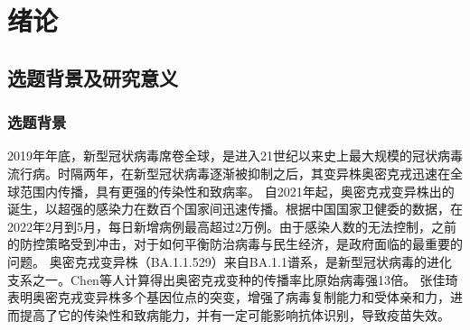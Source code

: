 



    


\section{绪论}
\subsection{选题背景及研究意义}
\subsubsection{选题背景}
2019年年底，新型冠状病毒席卷全球，是进入21世纪以来史上最大规模的冠状病毒流行病。时隔两年，在新型冠状病毒逐渐被抑制之后，其变异株奥密克戎迅速在全球范围内传播，具有更强的传染性和致病率。
自2021年起，奥密克戎变异株出的诞生，以超强的感染力在数百个国家间迅速传播。根据中国国家卫健委的数据，在2022年2月到5月，每日新增病例最高超过2万例\cite{zhang2022shanghai}。由于感染人数的无法控制，之前的防控策略受到冲击，对于如何平衡防治病毒与民生经济，是政府面临的最重要的问题\cite{张佳琦2022新型冠状病毒奥密克戎变异株的研究进展}。
奥密克戎变异株（BA.1.1.529）来自BA.1.1谱系，是新型冠状病毒的进化支系之一\cite{giovanetti2021evolution}。Chen\cite{chen2022omicron}等人计算得出奥密克戎变种的传播率比原始病毒强13倍。
张佳琦\cite{张佳琦2022新型冠状病毒奥密克戎变异株的研究进展}表明奥密克戎变异株多个基因位点的突变，增强了病毒复制能力和受体亲和力，进而提高了它的传染性和致病能力，并有一定可能影响抗体识别，导致疫苗失效。

